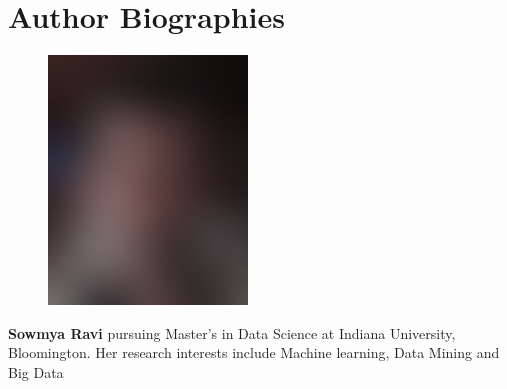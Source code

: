 \documentclass[9pt,twocolumn,twoside]{styles/osajnl}
\begin{document}


 
\section*{Author Biographies}
\begingroup
\setlength\intextsep{0pt}
\begin{minipage}[t][3.2cm][t]{1.0\columnwidth} %
  \begin{figure}
    \includegraphics[width=0.25\columnwidth]{images/john_smith.eps}
  \end{figure}
  \noindent
  {\bfseries Sowmya Ravi} pursuing Master's in Data Science at Indiana University, Bloomington. Her research interests include Machine learning, Data Mining and Big Data
\end{minipage}

\endgroup

\newpage
\end{document}
